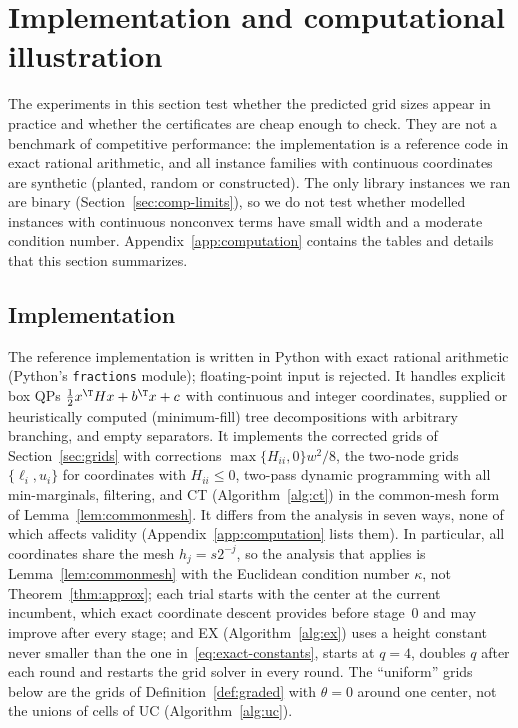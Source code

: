 \section{Implementation and computational illustration}\label{sec:computation}

The experiments in this section test whether the predicted grid sizes appear
in practice and whether the certificates are cheap enough to check. They are
not a benchmark of competitive performance: the implementation is a reference
code in exact rational arithmetic, and all instance families with continuous
coordinates are synthetic (planted, random or constructed). The only library
instances we ran are binary (Section~\ref{sec:comp-limits}), so we do not test
whether modelled instances with continuous nonconvex terms have small width
and a moderate condition number. Appendix~\ref{app:computation} contains the
tables and details that this section summarizes.

\subsection{Implementation}\label{sec:comp-impl}
The reference implementation is written in Python with exact rational
arithmetic (Python's \texttt{fractions} module); floating-point input is
rejected. It handles explicit box QPs $\frac12x^\T Hx+b^\T x+c$ with continuous
and integer coordinates, supplied or heuristically computed (minimum-fill)
tree decompositions with arbitrary branching, and empty separators. It
implements the corrected grids of Section~\ref{sec:grids} with corrections
$\max\{H_{ii},0\}w^2/8$, the two-node grids $\{\ell_i,u_i\}$ for coordinates
with $H_{ii}\le0$, two-pass dynamic programming with all min-marginals,
filtering, and CT (Algorithm~\ref{alg:ct}) in the common-mesh form of
Lemma~\ref{lem:commonmesh}. It differs from the analysis in seven ways, none
of which affects validity (Appendix~\ref{app:computation} lists them). In
particular, all coordinates share the mesh $h_j=s2^{-j}$, so the analysis
that applies is Lemma~\ref{lem:commonmesh} with the Euclidean condition number
$\kappa$, not Theorem~\ref{thm:approx}; each trial starts with the center at
the current incumbent, which exact coordinate descent provides before
stage~$0$ and may improve after every stage; and EX (Algorithm~\ref{alg:ex}) uses a height
constant never smaller than the one in~\eqref{eq:exact-constants}, starts at
$q=4$, doubles $q$ after each round and restarts the grid solver in every
round. The ``uniform'' grids below are the grids of
Definition~\ref{def:graded} with $\theta=0$ around one center, not the unions
of cells of UC (Algorithm~\ref{alg:uc}).

